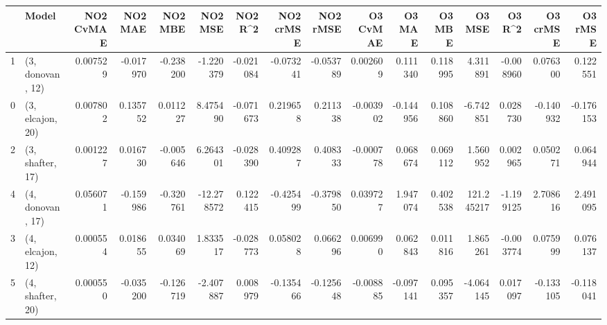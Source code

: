 \begin{tabular}{llrrrrrrrrrrrrrr}
\toprule
{} &             Model &  NO2 CvMAE &   NO2 MAE &   NO2 MBE &    NO2 MSE &   NO2 R\textasciicircum2 &  NO2 crMSE &  NO2 rMSE &  O3 CvMAE &    O3 MAE &    O3 MBE &      O3 MSE &    O3 R\textasciicircum2 &  O3 crMSE &   O3 rMSE \\
\midrule
1 &  (3, donovan, 12) &   0.007529 & -0.017970 & -0.238200 &  -1.220379 & -0.021084 &  -0.073241 & -0.053789 &  0.002609 &  0.111340 &  0.118995 &    4.311891 & -0.008960 &  0.076300 &  0.122551 \\
0 &  (3, elcajon, 20) &   0.007802 &  0.135752 &  0.011227 &   8.475490 & -0.071673 &   0.219658 &  0.211338 & -0.003902 & -0.144956 &  0.108860 &   -6.742851 &  0.028730 & -0.140932 & -0.176153 \\
2 &  (3, shafter, 17) &   0.001227 &  0.016730 & -0.005646 &   6.264301 & -0.028390 &   0.409287 &  0.408333 & -0.000778 &  0.068674 &  0.069112 &    1.560952 &  0.002965 &  0.050271 &  0.064944 \\
4 &  (4, donovan, 17) &   0.056071 & -0.159986 & -0.320761 & -12.278572 &  0.122415 &  -0.425499 & -0.379850 &  0.039727 &  1.947074 &  0.402538 &  121.245217 & -1.199125 &  2.708616 &  2.491095 \\
3 &  (4, elcajon, 12) &   0.000554 &  0.018655 &  0.034069 &   1.833517 & -0.028773 &   0.058028 &  0.066296 &  0.006990 &  0.062843 &  0.011816 &    1.865261 & -0.003774 &  0.075999 &  0.076137 \\
5 &  (4, shafter, 20) &   0.000550 & -0.035200 & -0.126719 &  -2.407887 &  0.008979 &  -0.135466 & -0.125648 & -0.008885 & -0.097141 &  0.095357 &   -4.064145 &  0.017097 & -0.133105 & -0.118041 \\
\bottomrule
\end{tabular}
